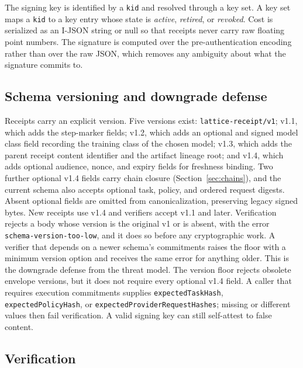 \documentclass[conference]{IEEEtran}
\newcommand{\code}[1]{\texttt{\small #1}}
\begin{document}
The signing key is identified by a \code{kid} and resolved through a key set. A key
set maps a \code{kid} to a key entry whose state is \emph{active}, \emph{retired}, or
\emph{revoked}. Cost is serialized as an I-JSON \cite{rfc7493} string or null so that
receipts never carry raw floating point numbers. The signature is computed over the
pre-authentication encoding rather than over the raw JSON, which removes any ambiguity
about what the signature commits to.

\subsection{Schema versioning and downgrade defense}

Receipts carry an explicit version. Five versions exist: \code{lattice-receipt/v1};
v1.1, which adds the step-marker fields; v1.2, which adds an optional and signed model
class field recording the training class of the chosen model; v1.3, which adds the
parent receipt content identifier and the artifact lineage root; and v1.4, which adds
optional audience, nonce, and expiry fields for freshness binding. Two further optional
v1.4 fields carry chain closure (Section~\ref{sec:chains}), and the current schema
also accepts optional task, policy, and ordered request digests. Absent optional
fields are omitted from canonicalization, preserving legacy signed bytes. New
receipts use v1.4 and verifiers accept v1.1 and later. Verification rejects a body whose
version is the original v1 or is absent, with the error \code{schema-version-too-low},
and it does so before any cryptographic work. A verifier that depends on a newer
schema's commitments raises the floor with a minimum version option and receives the
same error for anything older. This is the downgrade defense from the threat model.
The version floor rejects obsolete envelope versions, but it does not require every
optional v1.4 field. A caller that requires execution commitments supplies
\code{expectedTaskHash}, \code{expectedPolicyHash}, or
\code{expectedProviderRequestHashes}; missing or different values then fail verification.
A valid signing key can still self-attest to false content.

\subsection{Verification}
\end{document}
